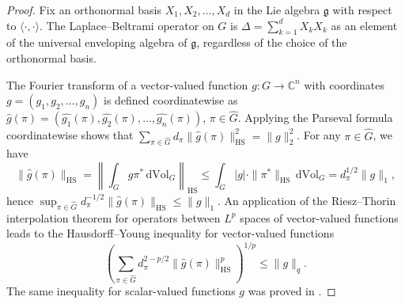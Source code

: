\documentclass[11pt,a4paper]{article}
\theoremstyle{definition}
\begin{document}
\begin{proof} Fix an orthonormal basis $X_1, X_2, \dots, X_d$ in the Lie algebra $\mathfrak{g}$ with respect to $\langle \cdot, \cdot \rangle$. The Laplace--Beltrami operator on $G$ is $\Delta = \sum_{k=1}^d X_k X_k$ as an element of the universal enveloping algebra of $\mathfrak{g}$, regardless of the choice of the orthonormal basis.

The Fourier transform of a vector-valued function $g: G \to \mathbb{C}^n$ with coordinates $g=(g_1, g_2, \ldots, g_n)$ is defined coordinatewise as $\widehat{g}(\pi) = (\widehat{g_1}(\pi), \widehat{g_2}(\pi), \ldots, \widehat{g_n}(\pi))$, $\pi \in \widehat{G}$. Applying the Parseval formula coordinatewise shows that $\sum_{\pi \in \widehat{G}} d_{\pi} \| \widehat{g}(\pi) \|_{\mathrm{HS}}^2 = \| g \|_2^2$. For any $\pi \in \widehat{G}$, we have
\[ \| \widehat{g}(\pi) \|_{\mathrm{HS}} = \left\| \int_G g \pi^* \, \mathrm{d} \mathrm{Vol}_G \right\|_{\mathrm{HS}} \le \int_G |g| \cdot \| \pi^* \|_{\mathrm{HS}} \, \mathrm{d} \mathrm{Vol}_G = d_{\pi}^{1/2} \| g \|_1 , \]
hence $\sup_{\pi \in \widehat{G}} d_{\pi}^{-1/2} \| \widehat{g}(\pi) \|_{\mathrm{HS}} \le \| g \|_1$. An application of the Riesz--Thorin interpolation theorem for operators between $L^p$ spaces of vector-valued functions \cite[p.\ 83]{HNVW} leads to the Hausdorff--Young inequality for vector-valued functions
\begin{equation}\label{HYgroups}
\left( \sum_{\pi \in \widehat{G}} d_{\pi}^{2-p/2} \| \widehat{g}(\pi) \|_{\mathrm{HS}}^p \right)^{1/p} \le \| g \|_q .
\end{equation}
The same inequality for scalar-valued functions $g$ was proved in \cite[p.\ 548]{RT}.


\end{proof}
\end{document}
